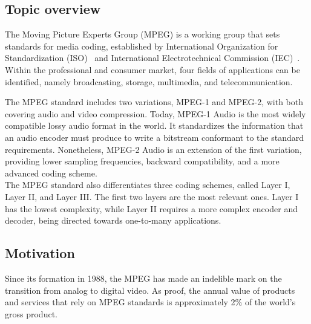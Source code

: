 
\subsection{Topic overview}
The Moving Picture Experts Group (MPEG) is a working group that sets standards for media coding, established by International Organization for Standardization (ISO)~\cite{iso} and International Electrotechnical Commission (IEC)~\cite{iec}.
Within the professional and consumer market, four fields of applications can be identified, namely broadcasting, storage, multimedia, and telecommunication. 

The MPEG standard includes two variations, MPEG-1 and MPEG-2, with both covering audio and video compression.
Today, MPEG-1 Audio is the most widely compatible lossy audio format in the world. It standardizes the information that an audio encoder must produce to write a bitstream conformant to the standard requirements. 
Nonetheless, MPEG-2 Audio is an extension of the first variation, providing lower sampling frequencies, backward compatibility, and a more advanced coding scheme.\\
The MPEG standard also differentiates three coding schemes, called Layer I, Layer II, and Layer III.
The first two layers are the most relevant ones. Layer I has the lowest complexity, while Layer II requires a more complex encoder and decoder, being directed towards one-to-many applications.

\subsection{Motivation}

Since its formation in 1988, the MPEG has made an indelible mark on the transition from analog to digital video. As proof, the annual value of products and services that rely on MPEG standards is approximately 2\% of the world's gross product.

